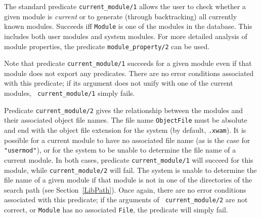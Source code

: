 \begin{description}
{%
%
%
%
%
%
}

    The standard predicate {\tt current\_module/1} allows the user to
    check whether a given module is {\em current} or to generate
    (through backtracking) all currently known modules.  Succeeds iff
    {\tt Module} is one of the modules in the database. This includes
    both user modules and system modules.  For more detailed analysis
    of module properties, the predicate {\tt module\_property/2}
    can be used.

    Note that predicate {\tt current\_module/1} succeeds for a given
    module even if that module does not export any predicates. There
    are no error conditions associated with this predicate; if its
    argument does not unify with one of the current modules, {\tt
    current\_module/1} simply fails.

    Predicate {\tt current\_module/2} gives the relationship between
    the modules and their associated object file names. The file name
    {\tt ObjectFile} must be absolute and end with the object file
    extension for the system (by default, {\tt .xwam}).
%
    It is possible for a current module to have no associated file
    name (as is the case for {\tt "usermod"}), or for the system to be
    unable to determine the file name of a current module. In both
    cases, predicate {\tt current\_module/1} will succeed for this
    module, while {\tt current\_module/2} will fail. The system is
    unable to determine the file name of a given module if that module
    is not in one of the directories of the search path (see
    Section~\ref{LibPath}).  Once again, there are no error conditions
    associated with this predicate; if the arguments of {\tt
    current\_module/2} are not correct, or {\tt Module} has no
    associated {\tt File}, the predicate will simply fail.


\end{description}
